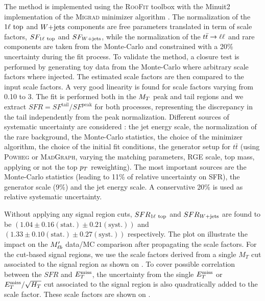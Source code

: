     The method is implemented using the \textsc{RooFit} toolbox  with the Minuit2
    implementation of the \textsc{Migrad} minimizer algorithm . The normalization
    of the $1\ell~\text{top}$ and $\text{$W$+jets}$ components are free parameters translated in term
    of scale factors, $SF_{1\ell~\text{top}}$ and $SF_{\text{$W$+jets}}$, while the normalization of
    the $t\bar{t} \rightarrow \ell \ell$ and rare components are taken from the Monte-Carlo and constrained
    with a 20\% uncertainty during the fit process. To validate the method, a closure test
    is performed by generating toy data from the Monte-Carlo where arbitrary scale factors
    where injected. The estimated scale factors are then compared to the input scale factors.
    A very good linearity is found for scale factors varying from 0.10 to 3. The fit is
    performed both in the $M_T$ peak and tail regions and we extract $SFR = SF^{\text{tail}}
    / SF^{\text{peak}}$ for both processes, representing the discrepancy in the tail
    independently from the peak normalization. Different sources of systematic uncertainty
    are considered : the jet energy scale, the normalization of the rare background, the
    Monte-Carlo statistics, the choice of the minimizer algorithm, the choice of the
    initial fit conditions, the generator setup for $t\bar{t}$ (using \textsc{Powheg} or
    \textsc{MadGraph}, varying the matching parameters, RGE scale, top mass, applying or
    not the top $p_T$ reweighting). The most important sources are the Monte-Carlo statistics
    (leading to 11\% of relative uncertainty on SFR), the generator scale (9\%) and the jet
    energy scale. A conservative 20\% is used as relative systematic uncertainty.

    Without applying any signal region cuts, $SFR_{1\ell~\text{top}}$ and $SFR_{\text{$W$+jets}}$ are found
    to be $(1.04 \pm 0.16 (\text{stat.}) \pm 0.21 (\text{syst.}))$ and $(1.33 \pm 0.10
    (\text{stat.}) \pm 0.27 (\text{syst.}) )$ respectively. The plot on 
    illustrate the impact on the $M'_{\ell b}$ data/MC comparison after propagating the scale
    factors. For the cut-based signal regions, we use the scale factors derived from a
    single $M_T$ cut associated to the signal region as shown on .
    To cover possible correlation between the $SFR$ and $E_T^\text{miss}$, the uncertainty from the
    single $E_T^\text{miss}$ or $E_T^\text{miss}/\sqrt{H_T}$ cut associated to the signal region is also
    quadratically added to the scale factor. These scale factors are shown on .

